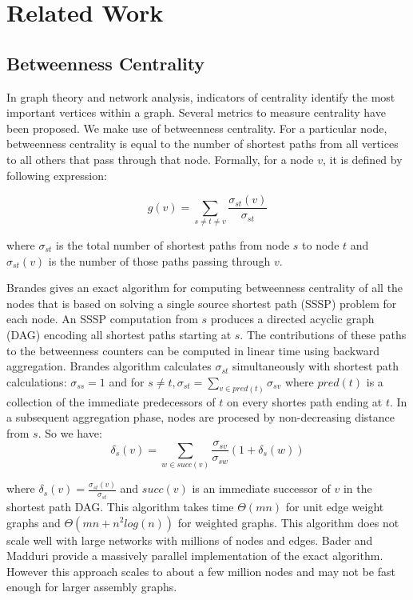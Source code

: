 \documentclass[runningheads,a4paper]{llncs}
\begin{document}
\section{Related Work}

\subsection*{Betweenness Centrality}
In graph theory and network analysis, indicators of centrality identify the most important vertices within a graph. Several metrics to measure centrality have been proposed. We make use of betweenness centrality. For a particular node, betweenness centrality is equal to the number of shortest paths from all vertices to all others that pass through that node. Formally, for a node $v$, it is defined by following expression:

$$g(v) = \sum_{s \neq t \neq v} \frac{\sigma_{st}(v)}{\sigma_{st}}$$

where $\sigma_{st}$ is the total number of shortest paths from node $s$ to node $t$ and $\sigma_{st}(v)$ is the number of those paths passing through $v$.

Brandes\cite{brandes} gives an exact algorithm for computing betweenness centrality of all the nodes that is based on solving a single source shortest path (SSSP) problem for each node. An SSSP computation from $s$ produces a directed acyclic graph (DAG) encoding all shortest paths starting at $s$.   The contributions of these paths to the betweenness counters can be computed in linear time using backward aggregation. Brandes algorithm calculates $\sigma_{st}$  simultaneously with shortest path calculations: $\sigma_{ss} = 1$ and for $s \neq t, \sigma_{st} = \sum_{v \in pred(t)} \sigma_{sv}$ where $pred(t)$ is a collection of the immediate predecessors of  $t$ on every shortes path ending at $t$. In a subsequent aggregation phase, nodes are procesed by non-decreasing distance from $s$. So we have: 
$$\delta_{s}(v) = \sum_{w \in succ(v)} \frac{\sigma_{sv}}{\sigma_{sw}}(1+\delta_{s}(w))$$

where $\delta_{s}(v) = \frac{\sigma_{st}(v)}{\sigma_{st}}$ and $succ(v)$ is an immediate successor of $v$  in the shortest path DAG.   
This algorithm takes time $\Theta(mn)$ for unit edge weight graphs and $\Theta(mn + n^{2}log(n))$ for weighted graphs. This algorithm does not scale well with large networks with millions of nodes and edges. Bader and Madduri\cite{bader} provide a massively parallel implementation of the exact algorithm. However this approach scales to about a few million nodes and may not be fast enough for larger assembly graphs. 
\end{document}
